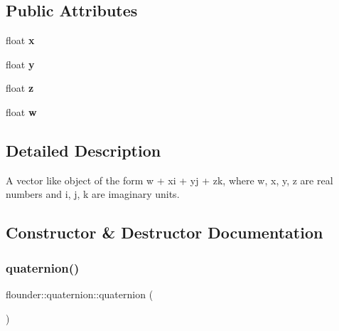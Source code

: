 \subsection*{Public Attributes}
\begin{DoxyCompactItemize}
\item 
\mbox{\label{classflounder_1_1quaternion_a667c26d9f6145f5de9114dce302b6864}} 
float {\bfseries x}
\item 
\mbox{\label{classflounder_1_1quaternion_ae2e4f21890847ff8d4525097830eca30}} 
float {\bfseries y}
\item 
\mbox{\label{classflounder_1_1quaternion_a79ad75b2af6050f7430b077492b81e70}} 
float {\bfseries z}
\item 
\mbox{\label{classflounder_1_1quaternion_a859023d43957077bd9d84ea388597375}} 
float {\bfseries w}
\end{DoxyCompactItemize}


\subsection{Detailed Description}
A vector like object of the form w + xi + yj + zk, where w, x, y, z are real numbers and i, j, k are imaginary units. 



\subsection{Constructor \& Destructor Documentation}
\mbox{\label{classflounder_1_1quaternion_ae3b0e48772c0394a9a87aedc9b89e5b6}} 
\subsubsection{\texorpdfstring{quaternion()}{quaternion()}\hspace{0.1cm}{\footnotesize\ttfamily [1/4]}}
{\footnotesize\ttfamily flounder\+::quaternion\+::quaternion (\begin{DoxyParamCaption}{ }\end{DoxyParamCaption})}



